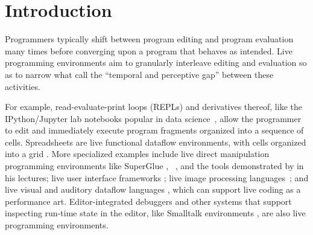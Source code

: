 \vspace{-5px}
\newcommand{\introSec}{Introduction}
\section{\protect\introSec} %
\label{sec:intro}


Programmers typically shift between program editing and program evaluation many times before converging upon a program that behaves as intended. 
Live programming environments aim to granularly interleave editing and evaluation so as to   
narrow what \citet{burckhardt2013s} call the ``temporal and perceptive gap'' between these activities.

For example, read-evaluate-print loops (REPLs) and derivatives thereof, like the IPython/Jupyter lab notebooks popular in data science~\cite{PER-GRA:2007}, allow the programmer to edit and immediately execute program fragments organized into a sequence of cells. 
Spreadsheets are live functional dataflow environments, with cells organized into a grid \cite{DBLP:journals/jfp/Wakeling07}. 
More specialized examples include live direct manipulation programming environments like SuperGlue
\cite{McDirmid:2007}, \sns{}~\cite{sns-pldi,sns-uist}, and the tools
demonstrated by \citet{victor2012inventing} in his lectures;
%
live user interface frameworks \cite{burckhardt2013s};
%
live image processing languages~\cite{DBLP:journals/vlc/Tanimoto90};
%
and live visual and auditory dataflow languages \cite{DBLP:conf/vl/BurnettAW98}, which can support live coding as a performance art.
Editor-integrated debuggers \cite{mccauley2008debugging} and other systems that support inspecting run-time state in the editor, like Smalltalk environments \cite{Goldberg:1983cn}, are also live programming environments. 

